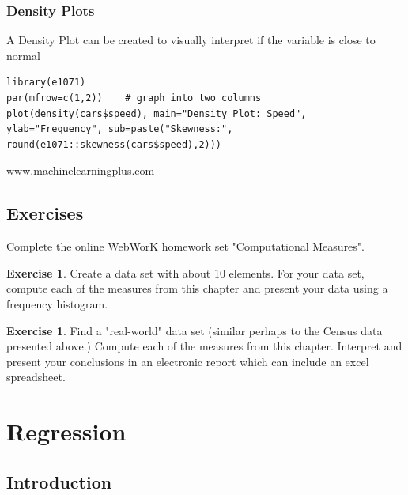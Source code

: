 \documentclass[10pt,]{book}
\theoremstyle{plain}
\theoremstyle{definition}
\theoremstyle{definition}
\theoremstyle{definition}
\newtheorem{exercise}[theorem]{Exercise}
\numberwithin{equation}{section}
\begin{document}
\subsection[{Density Plots}]{Density Plots}\label{subsection-6}

A Density Plot can be created to visually interpret if the variable is close to normal
%
\begin{lstlisting}[style=sageinput]
library(e1071)
par(mfrow=c(1,2))    # graph into two columns
plot(density(cars$speed), main="Density Plot: Speed", ylab="Frequency", sub=paste("Skewness:", round(e1071::skewness(cars$speed),2)))
\end{lstlisting}
\par

www.machinelearningplus.com
%
\typeout{************************************************}
\typeout{************************************************}
\section[{Exercises}]{Exercises}\label{section-9}
Complete the online WebWorK homework set "Computational Measures".%
\begin{exercise}\label{exercise-3}
Create a data set with about 10 elements. For your data set, compute each of the measures from this chapter and present your data using a frequency histogram.%
\end{exercise}
\begin{exercise}\label{exercise-4}
Find a "real-world" data set (similar perhaps to the Census data presented above.) Compute each of the measures from this chapter. Interpret and present your conclusions in an electronic report which can include an excel spreadsheet.%
\end{exercise}
\typeout{************************************************}
\typeout{************************************************}
\chapter[{Regression}]{Regression}\label{CurveEstimation}
\typeout{************************************************}
\typeout{************************************************}
\section[{Introduction}]{Introduction}\label{section-10}
\end{document}
